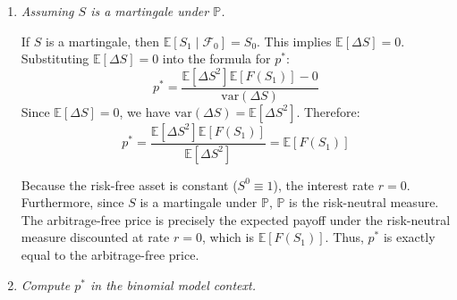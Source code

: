 \begin{enumerate}
            Factor out $x$ and recognize that $\mathbb{E}[\Delta S^2] - (\mathbb{E}[\Delta S])^2 = \mathrm{var}(\Delta S)$:
            \[ x \cdot \mathrm{var}(\Delta S) = \mathbb{E}[F(S_1)\Delta S] - \mathbb{E}[F(S_1)]\mathbb{E}[\Delta S] \]
            \[ x^* = \frac{\mathbb{E}[F(S_1)\Delta S] - \mathbb{E}[F(S_1)]\mathbb{E}[\Delta S]}{\mathrm{var}(\Delta S)} \]

            Now, plug $x^*$ back into the equation for $p$:
            \[ p^* = \mathbb{E}[F(S_1)] - \left( \frac{\mathbb{E}[F(S_1)\Delta S] - \mathbb{E}[F(S_1)]\mathbb{E}[\Delta S]}{\mathrm{var}(\Delta S)} \right) \mathbb{E}[\Delta S] \]
            \[ p^* = \frac{\mathbb{E}[F(S_1)]\mathrm{var}(\Delta S) - \mathbb{E}[F(S_1)\Delta S]\mathbb{E}[\Delta S] + \mathbb{E}[F(S_1)](\mathbb{E}[\Delta S])^2}{\mathrm{var}(\Delta S)} \]

            Since $\mathrm{var}(\Delta S) + (\mathbb{E}[\Delta S])^2 = \mathbb{E}[\Delta S^2]$, we can combine the terms with $\mathbb{E}[F(S_1)]$:
            \[ p^* = \frac{\mathbb{E}[\Delta S^2]\mathbb{E}[F(S_1)] - \mathbb{E}[\Delta S]\mathbb{E}[F(S_1)\Delta S]}{\mathrm{var}(\Delta S)} \]

      \item \textsl{Assuming $S$ is a martingale under $\mathbb{P}$.}

            If $S$ is a martingale, then $\mathbb{E}[S_1 \mid \mathcal{F}_0] = S_0$. This implies $\mathbb{E}[\Delta S] = 0$.
            Substituting $\mathbb{E}[\Delta S] = 0$ into the formula for $p^*$:
            \[ p^* = \frac{\mathbb{E}[\Delta S^2]\mathbb{E}[F(S_1)] - 0}{\mathrm{var}(\Delta S)} \]
            Since $\mathbb{E}[\Delta S] = 0$, we have $\mathrm{var}(\Delta S) = \mathbb{E}[\Delta S^2]$. Therefore:
            \[ p^* = \frac{\mathbb{E}[\Delta S^2]\mathbb{E}[F(S_1)]}{\mathbb{E}[\Delta S^2]} = \mathbb{E}[F(S_1)] \]

            Because the risk-free asset is constant ($S^0 \equiv 1$), the interest rate $r=0$. Furthermore, since $S$ is a martingale under $\mathbb{P}$, $\mathbb{P}$ is the risk-neutral measure. The arbitrage-free price is precisely the expected payoff under the risk-neutral measure discounted at rate $r=0$, which is $\mathbb{E}[F(S_1)]$. Thus, $p^*$ is exactly equal to the arbitrage-free price.

      \item \textsl{Compute $p^*$ in the binomial model context.}


\end{enumerate}
